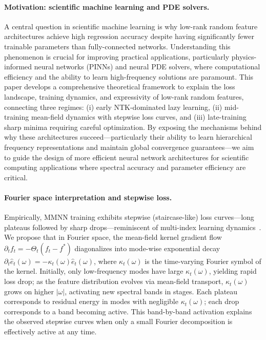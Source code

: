 \documentclass{article}
\begin{document}
\paragraph{Motivation: scientific machine learning and PDE solvers.}
A central question in scientific machine learning is why low-rank random feature architectures achieve high regression accuracy despite having significantly fewer trainable parameters than fully-connected networks. Understanding this phenomenon is crucial for improving practical applications, particularly physics-informed neural networks (PINNs) and neural PDE solvers, where computational efficiency and the ability to learn high-frequency solutions are paramount. This paper develops a comprehensive theoretical framework to explain the loss landscape, training dynamics, and expressivity of low-rank random features, connecting three regimes: (i) early NTK-dominated lazy learning, (ii) mid-training mean-field dynamics with stepwise loss curves, and (iii) late-training sharp minima requiring careful optimization. By exposing the mechanisms behind why these architectures succeed—particularly their ability to learn hierarchical frequency representations and maintain global convergence guarantees—we aim to guide the design of more efficient neural network architectures for scientific computing applications where spectral accuracy and parameter efficiency are critical.

\paragraph{Fourier space interpretation and stepwise loss.}
Empirically, MMNN training exhibits stepwise (staircase-like) loss curves—long plateaus followed by sharp drops—reminiscent of multi-index learning dynamics~\cite{benarous2021online}. We propose that in Fourier space, the mean-field kernel gradient flow \( \partial_t f_t = -\Theta_t(f_t - f^*) \) diagonalizes into mode-wise exponential decay \( \partial_t \hat{e}_t(\omega) = -\kappa_t(\omega) \hat{e}_t(\omega) \), where \( \kappa_t(\omega) \) is the time-varying Fourier symbol of the kernel. Initially, only low-frequency modes have large \( \kappa_t(\omega) \), yielding rapid loss drop; as the feature distribution evolves via mean-field transport, \( \kappa_t(\omega) \) grows on higher \( |\omega| \), activating new spectral bands in stages. Each plateau corresponds to residual energy in modes with negligible \( \kappa_t(\omega) \); each drop corresponds to a band becoming active. This band-by-band activation explains the observed stepwise curves when only a small Fourier decomposition is effectively active at any time.
\end{document}
